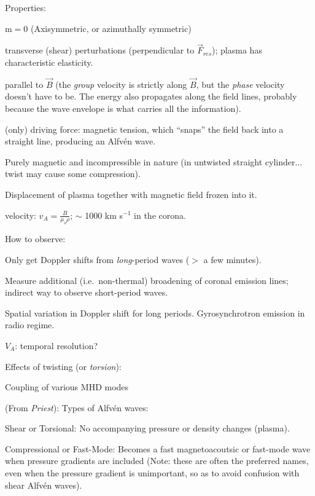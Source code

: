 \documentclass[12pt]{article}
\begin{document}
Properties:
\begin{itemize*}
    \item m$=$0 (Axisymmetric, or azimuthally symmetric)
    \item transverse (shear) perturbations (perpendicular to $\vec{F}_{res}$);
        plasma has characteristic elasticity.
    \item parallel to $\vec{B}$ (the \emph{group} velocity  is strictly along
        $\vec{B}$, but the \emph{phase} velocity doesn't have to be. The
        energy also propagates along the field lines, probably because the
        wave envelope is what carries all the information).
    \item (only) driving force: magnetic tension, which ``snaps'' the field back
        into a straight line, producing an Alfv\'en wave.
    \item Purely magnetic and incompressible in nature (in untwisted straight
        cylinder$\ldots$ twist may cause some compression).
    \item Displacement of plasma together with magnetic field frozen
        into it.
    \item velocity: $v_{A} = \frac{B}{\mu_{o}\rho}$;
        $\sim$ 1000 km s$^{-1}$ in the corona.
\end{itemize*}
How to observe:
\begin{itemize*}
    \item Only get Doppler shifts from \emph{long}-period waves
        ($>$ a few minutes).
    \item Measure additional (i.e.\ non-thermal) broadening
        of coronal emission lines; indirect way to observe short-period waves.
    \item Spatial variation in Doppler shift for long periods.
        Gyrosynchrotron emission in radio regime.
    \item $V_A$: temporal resolution?
\end{itemize*}
Effects of twisting (or \emph{torsion}):
\begin{itemize*}
    \item Coupling of various MHD modes
\end{itemize*}

(From \emph{Priest}): Types of Alfv\'en waves:
\begin{itemize*}
    \item Shear or Torsional: No accompanying pressure or
        density changes (plasma).
    \item Compressional or Fast-Mode: Becomes a fast
        magnetoacoutsic or fast-mode wave when pressure gradients
        are included (Note: these are often the preferred names,
        even when the pressure gradient is unimportant, so as to
        avoid confusion with shear Alfv\'en waves).
\end{itemize*}
\end{document}
